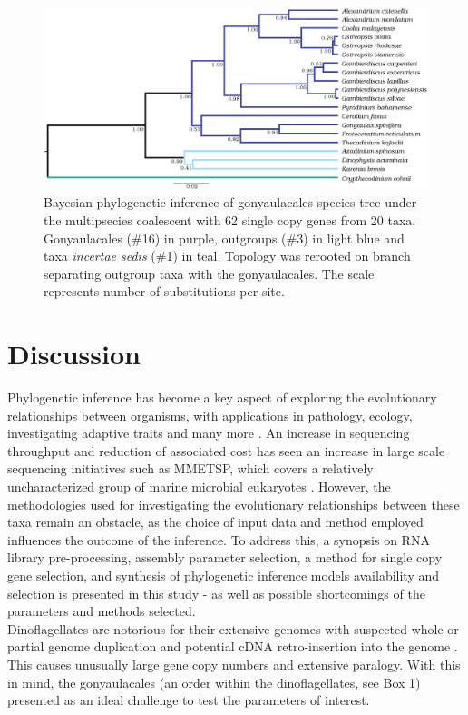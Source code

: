 \documentclass[12pt]{article}
\begin{document}
\begin{figure} 
\includegraphics[scale=.25]{figures/Aug2_20-taxa-combined-fig_MCC_trees.png} 
\caption{Bayesian phylogenetic inference of gonyaulacales species tree under the multipsecies coalescent with 62 single copy genes from 20 taxa. Gonyaulacales (\#16) in purple, outgroups (\#3) in light blue and taxa \textit{incertae sedis} (\#1) in teal. Topology was rerooted on branch separating outgroup taxa with the gonyaulacales. The scale represents number of substitutions per site.} 
\label{fig:SCmscBI}
\end{figure} 
\FloatBarrier

\newpage
\section{Discussion}
Phylogenetic inference has become a key aspect of exploring the evolutionary relationships between organisms, with applications in pathology, ecology, investigating adaptive traits and many more \cite{heath2008taxon}. 
An increase in sequencing throughput and reduction of associated cost has seen an increase in large scale sequencing initiatives such as MMETSP, which covers a relatively uncharacterized group of marine microbial eukaryotes \cite{keeling2014marine}.
However, the methodologies used for investigating the evolutionary relationships between these taxa remain an obstacle, as the choice of input data and method employed influences the outcome of the inference. 
To address this, a synopsis on RNA library pre-processing, assembly parameter selection, a method for single copy gene selection, and synthesis of phylogenetic inference models availability and selection is presented in this study - as well as possible shortcomings of the parameters and methods selected. \\
Dinoflagellates are notorious for their extensive genomes with suspected whole or partial genome duplication and potential cDNA retro-insertion into the genome \cite{van2009florida,beauchemin2012dinoflagellate,slamovits2008widespread,hou2009distinct,lin2011genomic}. 
This causes unusually large gene copy numbers and extensive paralogy. 
With this in mind, the gonyaulacales (an order within the dinoflagellates, see Box 1) presented as an ideal challenge to test the parameters of interest.
\end{document}
